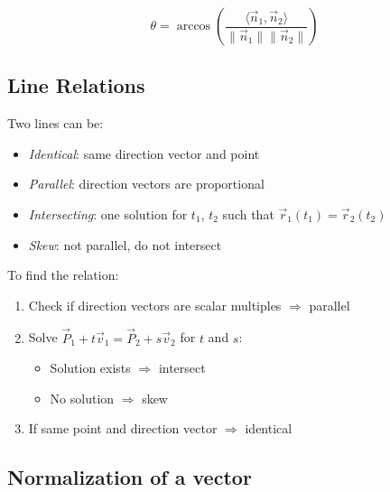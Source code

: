 \[
	\theta = \arccos\left( \frac{\langle\vec{n}_1, \vec{n}_2\rangle}{\|\vec{n}_1\|\|\vec{n}_2\|} \right)
\]

\subsection{Line Relations}

Two lines can be:

\begin{itemize}

	\item \emph{Identical}: same direction vector and point

	\item \emph{Parallel}: direction vectors are proportional

	\item \emph{Intersecting}: one solution for \(t_1\), \(t_2\) such that \(\vec{r}_1(t_1) = \vec{r}_2(t_2)\)

	\item \emph{Skew}: not parallel, do not intersect

\end{itemize}

To find the relation:

\begin{enumerate}

	\item Check if direction vectors are scalar multiples \(\Rightarrow\) parallel

	\item Solve \(\vec{P}_1 + t\vec{v}_1 = \vec{P}_2 + s\vec{v}_2\) for \(t\) and \(s\):

	\begin{itemize}

		\item Solution exists \(\Rightarrow\) intersect

		\item No solution \(\Rightarrow\) skew

	\end{itemize}

	\item If same point and direction vector \(\Rightarrow\) identical

\end{enumerate}

\subsection{Normalization of a vector}

